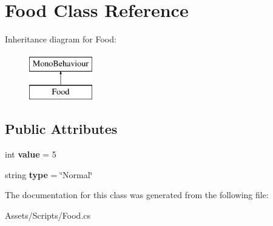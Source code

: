 \hypertarget{class_food}{}\section{Food Class Reference}
\label{class_food}
Inheritance diagram for Food\+:\begin{figure}[H]
\begin{center}
\leavevmode
\includegraphics[height=2.000000cm]{class_food}
\end{center}
\end{figure}
\subsection*{Public Attributes}
\begin{DoxyCompactItemize}
\item 
int {\bfseries value} = 5\hypertarget{class_food_a54e3f74b4f899a29275846610db2f6ef}{}\label{class_food_a54e3f74b4f899a29275846610db2f6ef}

\item 
string {\bfseries type} = \char`\"{}Normal\char`\"{}\hypertarget{class_food_adff3b58565023eaa590bc565163b5be8}{}\label{class_food_adff3b58565023eaa590bc565163b5be8}

\end{DoxyCompactItemize}


The documentation for this class was generated from the following file\+:\begin{DoxyCompactItemize}
\item 
Assets/\+Scripts/Food.\+cs\end{DoxyCompactItemize}
